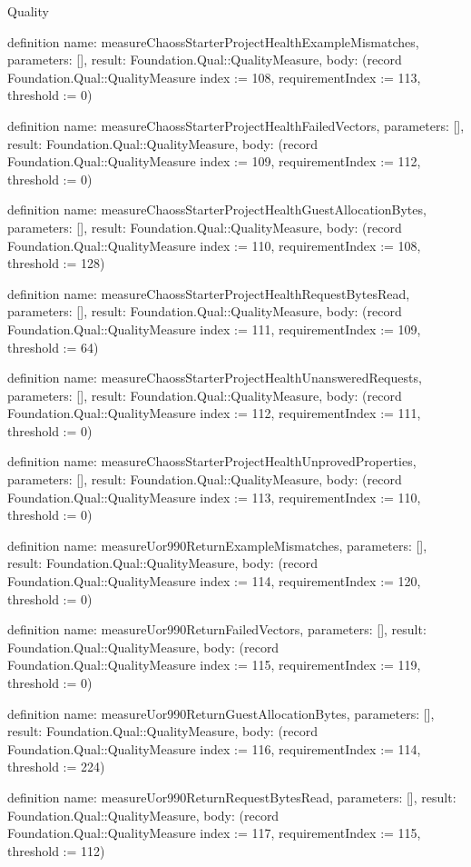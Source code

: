 \begin{lexlean}{Quality}
\begin{semanticmodule}
definition{
  name: measureChaossStarterProjectHealthExampleMismatches,
  parameters: [],
  result: Foundation.Qual::QualityMeasure,
  body: (record Foundation.Qual::QualityMeasure {index := 108, requirementIndex := 113, threshold := 0})
}

definition{
  name: measureChaossStarterProjectHealthFailedVectors,
  parameters: [],
  result: Foundation.Qual::QualityMeasure,
  body: (record Foundation.Qual::QualityMeasure {index := 109, requirementIndex := 112, threshold := 0})
}

definition{
  name: measureChaossStarterProjectHealthGuestAllocationBytes,
  parameters: [],
  result: Foundation.Qual::QualityMeasure,
  body: (record Foundation.Qual::QualityMeasure {index := 110, requirementIndex := 108, threshold := 128})
}

definition{
  name: measureChaossStarterProjectHealthRequestBytesRead,
  parameters: [],
  result: Foundation.Qual::QualityMeasure,
  body: (record Foundation.Qual::QualityMeasure {index := 111, requirementIndex := 109, threshold := 64})
}

definition{
  name: measureChaossStarterProjectHealthUnansweredRequests,
  parameters: [],
  result: Foundation.Qual::QualityMeasure,
  body: (record Foundation.Qual::QualityMeasure {index := 112, requirementIndex := 111, threshold := 0})
}

definition{
  name: measureChaossStarterProjectHealthUnprovedProperties,
  parameters: [],
  result: Foundation.Qual::QualityMeasure,
  body: (record Foundation.Qual::QualityMeasure {index := 113, requirementIndex := 110, threshold := 0})
}

definition{
  name: measureUor990ReturnExampleMismatches,
  parameters: [],
  result: Foundation.Qual::QualityMeasure,
  body: (record Foundation.Qual::QualityMeasure {index := 114, requirementIndex := 120, threshold := 0})
}

definition{
  name: measureUor990ReturnFailedVectors,
  parameters: [],
  result: Foundation.Qual::QualityMeasure,
  body: (record Foundation.Qual::QualityMeasure {index := 115, requirementIndex := 119, threshold := 0})
}

definition{
  name: measureUor990ReturnGuestAllocationBytes,
  parameters: [],
  result: Foundation.Qual::QualityMeasure,
  body: (record Foundation.Qual::QualityMeasure {index := 116, requirementIndex := 114, threshold := 224})
}

definition{
  name: measureUor990ReturnRequestBytesRead,
  parameters: [],
  result: Foundation.Qual::QualityMeasure,
  body: (record Foundation.Qual::QualityMeasure {index := 117, requirementIndex := 115, threshold := 112})
}


\end{semanticmodule}
\end{lexlean}
